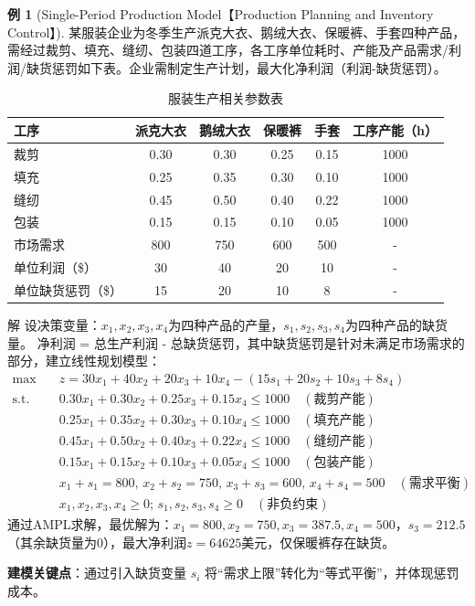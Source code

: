 \documentclass[12pt]{article}
\theoremstyle{plain}
\theoremstyle{definition}
\newtheorem{exm}{例}[subsection]
\newenvironment{slv}[1][解]{\begin{paragraph}{#1}\mbox{}}{\end{paragraph}\par\nopagebreak}
\newcommand{\st}{\mathrel{\text{s.t.}}}
\begin{document}
\begin{exm}[Single-Period Production Model【Production Planning and Inventory Control】]
    某服装企业为冬季生产派克大衣、鹅绒大衣、保暖裤、手套四种产品，需经过裁剪、填充、缝纫、包装四道工序，各工序单位耗时、产能及产品需求/利润/缺货惩罚如下表。企业需制定生产计划，最大化净利润（利润-缺货惩罚）。

    \begin{table}[!htbp]
    \centering
    \caption{服装生产相关参数表}
    \begin{tabular}{lccccc}
        \toprule
        工序 & 派克大衣 & 鹅绒大衣 & 保暖裤 & 手套 & 工序产能（h）\\
        \midrule
        裁剪 & 0.30 & 0.30 & 0.25 & 0.15 & 1000 \\
        填充 & 0.25 & 0.35 & 0.30 & 0.10 & 1000 \\
        缝纫 & 0.45 & 0.50 & 0.40 & 0.22 & 1000 \\
        包装 & 0.15 & 0.15 & 0.10 & 0.05 & 1000 \\
        市场需求 & 800 & 750 & 600 & 500 & - \\
        单位利润（\$） & 30 & 40 & 20 & 10 & - \\
        单位缺货惩罚（\$） & 15 & 20 & 10 & 8 & - \\
        \bottomrule
    \end{tabular}
    \end{table}

    \begin{slv}
    设决策变量：$x_1,x_2,x_3,x_4$为四种产品的产量，$s_1,s_2,s_3,s_4$为四种产品的缺货量。
    净利润 = 总生产利润 - 总缺货惩罚，其中缺货惩罚是针对未满足市场需求的部分，建立线性规划模型：
    \begin{align*}
        \max \quad & z=30x_1+40x_2+20x_3+10x_4-(15s_1+20s_2+10s_3+8s_4) \\
        \st \quad & 0.30x_1+0.30x_2+0.25x_3+0.15x_4 \leq 1000 \quad (\text{裁剪产能}) \\
        & 0.25x_1+0.35x_2+0.30x_3+0.10x_4 \leq 1000 \quad (\text{填充产能}) \\
        & 0.45x_1+0.50x_2+0.40x_3+0.22x_4 \leq 1000 \quad (\text{缝纫产能}) \\
        & 0.15x_1+0.15x_2+0.10x_3+0.05x_4 \leq 1000 \quad (\text{包装产能}) \\
        & x_1+s_1=800,\,x_2+s_2=750,\,x_3+s_3=600,\,x_4+s_4=500 \quad (\text{需求平衡}) \\
        & x_1,x_2,x_3,x_4 \geq 0;\,s_1,s_2,s_3,s_4 \geq 0 \quad (\text{非负约束})
    \end{align*}
    通过AMPL求解，最优解为：$x_1=800,x_2=750,x_3=387.5,x_4=500$，$s_3=212.5$（其余缺货量为0），最大净利润$z=64625$美元，仅保暖裤存在缺货。
    \end{slv}
    \textbf{建模关键点}：通过引入缺货变量 $s_i$ 将“需求上限”转化为“等式平衡”，并体现惩罚成本。
\end{exm}
\end{document}

